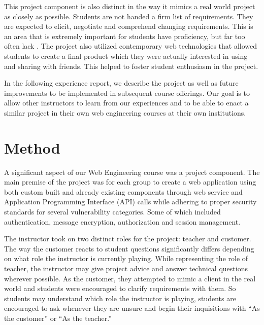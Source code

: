 \documentclass[conference]{IEEEtran}
\begin{document}
This project component is also distinct in the way it mimics a real world project as closely as possible. Students are not
handed a firm list of requirements. They are expected to elicit, negotiate and comprehend changing requirements. This is an
area that is extremely important for students have proficiency, but far too often lack\cite{Barrett:1997:SRG:268085.268203} \cite{Sajid:2010:MTT:1890810.1890819}. The project also utilized contemporary web technologies that allowed students to create a final product which they were actually interested in using and sharing with friends. This helped to foster student enthusiasm in the project.

In the following experience report, we describe the project as well as future improvements to be implemented in
subsequent course offerings. Our goal is to allow other instructors to learn from our experiences and to be able to enact a similar project in their own web engineering courses at their own institutions.

\section{Method}

A significant aspect of our Web Engineering course was a project component. The main premise of the project was for each group to create a web application using both custom built and already existing components through web service and Application Programming Interface (API) calls while adhering to proper security standards for several vulnerability categories. Some of which included authentication, message encryption, authorization and session management.

The instructor took on two distinct roles for the project: teacher and customer. The way the customer reacts to student questions significantly differs depending on what role the instructor is currently playing. While representing the role of teacher, the instructor may give project advice and answer technical questions wherever possible. As the customer, they attempted to mimic a client in the real world and students were encouraged to clarify requirements with them. So students may understand which role the instructor is playing, students are encouraged to ask whenever they are unsure and begin their inquisitions with “As the customer” or “As the teacher.”
\end{document}
